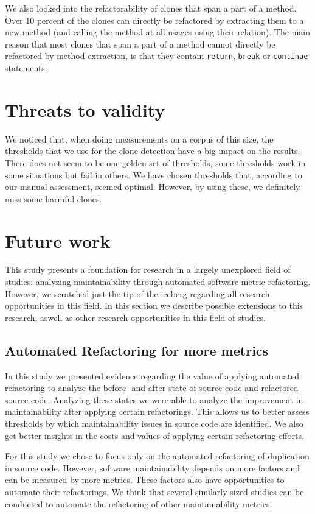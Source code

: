 We also looked into the refactorability of clones that span a part of a method. Over 10 percent of the clones can directly be refactored by extracting them to a new method (and calling the method at all usages using their relation). The main reason that most clones that span a part of a method cannot directly be refactored by method extraction, is that they contain \texttt{return}, \texttt{break} or \texttt{continue} statements.

\section{Threats to validity}\label{chap:threatstovalidity}
We noticed that, when doing measurements on a corpus of this size, the thresholds that we use for the clone detection have a big impact on the results. There does not seem to be one golden set of thresholds, some thresholds work in some situations but fail in others. We have chosen thresholds that, according to our manual assessment, seemed optimal. However, by using these, we definitely miss some harmful clones.


\section{Future work} \label{sec:future_work}
This study presents a foundation for research in a largely unexplored field of studies: analyzing maintainability through automated software metric refactoring. However, we scratched just the tip of the iceberg regarding all research opportunities in this field. In this section we describe possible extensions to this research, aswell as other research opportunities in this field of studies.

\subsection{Automated Refactoring for more metrics}
In this study we presented evidence regarding the value of applying automated refactoring to analyze the before- and after state of source code and refactored source code. Analyzing these states we were able to analyze the improvement in maintainability after applying certain refactorings. This allows us to better assess thresholds by which maintainability issues in source code are identified. We also get better insights in the costs and values of applying certain refactoring efforts.

For this study we chose to focus only on the automated refactoring of duplication in source code. However, software maintainability depends on more factors and can be measured by more metrics. These factors also have opportunities to automate their refactorings. We think that several similarly sized studies can be conducted to automate the refactoring of other maintainability metrics.

